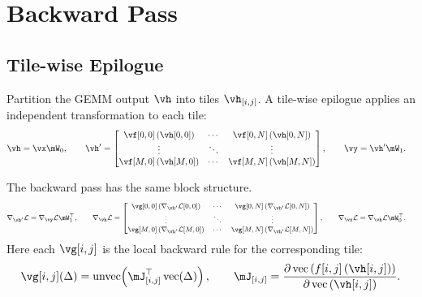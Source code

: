 \section{Backward Pass}

\subsection{Tile-wise Epilogue}
\label{sec:tile-wise-epilogue}

Partition the GEMM output $\vh$ into tiles $\vh_{[i,j]}$. A tile-wise epilogue applies an independent transformation to each tile:
\begin{align*}
\vh &= \vx \mW_0, \qquad
\vh^\prime =
\begin{bmatrix}
\vf[0,0]\left(\vh[0,0]\right) & \cdots & \vf[0,N]\left(\vh[0,N]\right) \\
\vdots & \ddots & \vdots \\
\vf[M,0]\left(\vh[M,0]\right) & \cdots & \vf[M,N]\left(\vh[M,N]\right)
\end{bmatrix},
\qquad
\vy = \vh^\prime \mW_1 .
\end{align*}

The backward pass has the same block structure.
\begin{equation*}
\footnotesize    
\begin{aligned}
\nabla_{\vh^\prime}\mathcal{L}
&= \nabla_{\vy}\mathcal{L}\mW_1^\top, \qquad
\nabla_{\vh}\mathcal{L} =
\begin{bmatrix}
\vg[0,0]\left(\nabla_{\vh^\prime}\mathcal{L}[0,0]\right) & \cdots & \vg[0,N]\left(\nabla_{\vh^\prime}\mathcal{L}[0,N]\right) \\
\vdots & \ddots & \vdots \\
\vg[M,0]\left(\nabla_{\vh^\prime}\mathcal{L}[M,0]\right) & \cdots & \vg[M,N]\left(\nabla_{\vh^\prime}\mathcal{L}[M,N]\right)
\end{bmatrix},
\qquad
\nabla_{\vx}\mathcal{L}
= \nabla_{\vh}\mathcal{L}\mW_0^\top .
\end{aligned}
\end{equation*}
Here each $\vg[i,j]$ is the local backward rule for the corresponding tile:
\begin{align*}
\vg[i,j](\Delta)
=
\operatorname{unvec}\!\left(
\mJ_{[i,j]}^\top \operatorname{vec}(\Delta)
\right),
\qquad
\mJ_{[i,j]}
=
\frac{\partial \operatorname{vec}\left(f[i,j]\left(\vh[i,j]\right)\right)}
     {\partial \operatorname{vec}\left(\vh[i,j]\right)}.
\end{align*}

